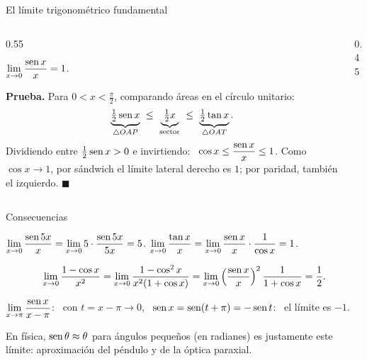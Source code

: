 \documentclass[10pt,aspectratio=169]{beamer}
\begin{document}
\begin{frame}{El límite trigonométrico fundamental}
  \begin{columns}
    \begin{column}{0.55\textwidth}
      \begin{teorema}
        $\displaystyle\lim_{x\to0}\frac{\operatorname{sen} x}{x}=1$.
      \end{teorema}
      \textbf{Prueba.} Para $0<x<\frac\pi2$, comparando áreas en el círculo unitario:
      \[ \underbrace{\tfrac12\sen x}_{\triangle OAP}\ \le\ \underbrace{\tfrac12x}_{\text{sector}}\ \le\ \underbrace{\tfrac12\tan x}_{\triangle OAT}. \]
      Dividiendo entre $\frac12\operatorname{sen} x>0$ e invirtiendo: \ $\cos x\le\dfrac{\operatorname{sen} x}{x}\le1$.
      Como $\cos x\to1$, por sándwich el límite lateral derecho es $1$; por paridad, también el izquierdo. $\blacksquare$
    \end{column}
    \begin{column}{0.45\textwidth}
      \centering
    \end{column}
  \end{columns}
\end{frame}

\begin{frame}{Consecuencias}
  \begin{ejemplo}[11]
    $\displaystyle\lim_{x\to0}\frac{\operatorname{sen}5x}{x}=\lim_{x\to0}5\cdot\frac{\operatorname{sen}5x}{5x}=5$. \qquad
    $\displaystyle\lim_{x\to0}\frac{\tan x}{x}=\lim_{x\to0}\frac{\operatorname{sen} x}{x}\cdot\frac{1}{\cos x}=1$.
  \end{ejemplo}
  \begin{ejemplo}[12]
    \[ \lim_{x\to0}\frac{1-\cos x}{x^2}=\lim_{x\to0}\frac{1-\cos^2x}{x^2(1+\cos x)}=\lim_{x\to0}\left(\frac{\operatorname{sen} x}{x}\right)^2\frac{1}{1+\cos x}=\frac12. \]
  \end{ejemplo}
  \begin{ejemplo}[13]
    $\displaystyle\lim_{x\to\pi}\frac{\operatorname{sen} x}{x-\pi}$: \ con $t=x-\pi\to0$, \ $\operatorname{sen} x=\operatorname{sen}(t+\pi)=-\operatorname{sen} t$: \ el límite es $-1$.
  \end{ejemplo}
  \begin{observacion}
    En física, $\operatorname{sen}\theta\approx\theta$ para ángulos pequeños (en radianes) es justamente este límite: aproximación del péndulo y de la óptica paraxial.
  \end{observacion}
\end{frame}
\end{document}
